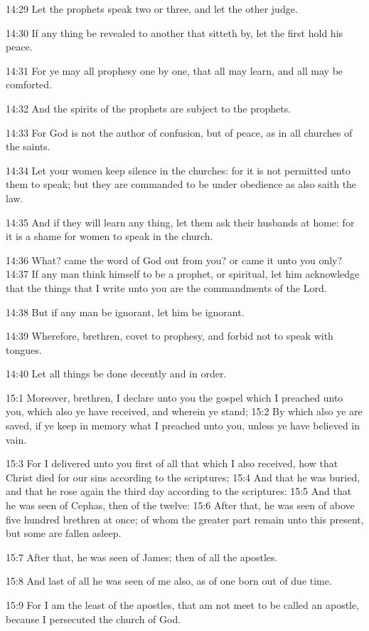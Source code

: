 14:29 Let the prophets speak two or three, and let the other judge.

14:30 If any thing be revealed to another that sitteth by, let the first hold his peace.

14:31 For ye may all prophesy one by one, that all may learn, and all may be comforted.

14:32 And the spirits of the prophets are subject to the prophets.

14:33 For God is not the author of confusion, but of peace, as in all churches of the saints.

14:34 Let your women keep silence in the churches: for it is not permitted unto them to speak; but they are commanded to be under obedience as also saith the law.

14:35 And if they will learn any thing, let them ask their husbands at home: for it is a shame for women to speak in the church.

14:36 What? came the word of God out from you? or came it unto you only?  14:37 If any man think himself to be a prophet, or spiritual, let him acknowledge that the things that I write unto you are the commandments of the Lord.

14:38 But if any man be ignorant, let him be ignorant.

14:39 Wherefore, brethren, covet to prophesy, and forbid not to speak with tongues.

14:40 Let all things be done decently and in order.

15:1 Moreover, brethren, I declare unto you the gospel which I preached unto you, which also ye have received, and wherein ye stand; 15:2 By which also ye are saved, if ye keep in memory what I preached unto you, unless ye have believed in vain.

15:3 For I delivered unto you first of all that which I also received, how that Christ died for our sins according to the scriptures; 15:4 And that he was buried, and that he rose again the third day according to the scriptures: 15:5 And that he was seen of Cephas, then of the twelve: 15:6 After that, he was seen of above five hundred brethren at once; of whom the greater part remain unto this present, but some are fallen asleep.

15:7 After that, he was seen of James; then of all the apostles.

15:8 And last of all he was seen of me also, as of one born out of due time.

15:9 For I am the least of the apostles, that am not meet to be called an apostle, because I persecuted the church of God.

